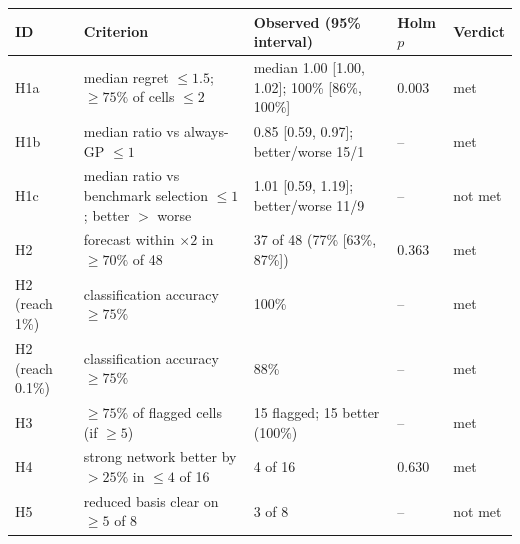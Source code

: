 \begin{tabular}{p{1.5cm}p{4.4cm}p{5.2cm}p{1.3cm}p{1.6cm}}
\toprule
ID & Criterion & Observed (95\% interval) & Holm $p$ & Verdict \\
\midrule
H1a & median regret $\le1.5$; $\ge75\%$ of cells $\le2$ & median 1.00 [1.00, 1.02]; 100\% [86\%, 100\%] & 0.003 & met \\
H1b & median ratio vs always-GP $\le1$ & 0.85 [0.59, 0.97]; better/worse 15/1 & -- & met \\
H1c & median ratio vs benchmark selection $\le1$; better $>$ worse & 1.01 [0.59, 1.19]; better/worse 11/9 & -- & not met \\
H2 & forecast within $\times2$ in $\ge70\%$ of 48 & 37 of 48 (77\% [63\%, 87\%]) & 0.363 & met \\
H2 (reach 1\%) & classification accuracy $\ge75\%$ & 100\% & -- & met \\
H2 (reach 0.1\%) & classification accuracy $\ge75\%$ & 88\% & -- & met \\
H3 & $\ge75\%$ of flagged cells (if $\ge5$) & 15 flagged; 15 better (100\%) & -- & met \\
H4 & strong network better by $>25\%$ in $\le4$ of 16 & 4 of 16 & 0.630 & met \\
H5 & reduced basis clear on $\ge5$ of 8 & 3 of 8 & -- & not met \\
\bottomrule
\end{tabular}
